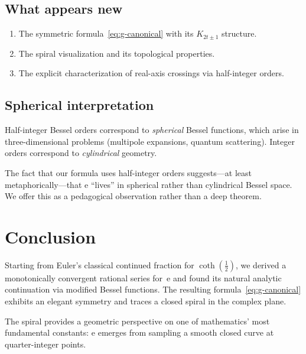 \documentclass[11pt]{article}
\theoremstyle{definition}
\theoremstyle{remark}
\newcommand{\ee}{\mathrm{e}}
\begin{document}
\subsection{What appears new}

\begin{enumerate}
\item The symmetric formula~\eqref{eq:g-canonical} with its $K_{2t\pm 1}$
structure.
\item The spiral visualization and its topological properties.
\item The explicit characterization of real-axis crossings via half-integer
orders.
\end{enumerate}

\subsection{Spherical interpretation}

Half-integer Bessel orders correspond to \emph{spherical} Bessel functions,
which arise in three-dimensional problems (multipole expansions, quantum
scattering). Integer orders correspond to \emph{cylindrical} geometry.

The fact that our formula uses half-integer orders suggests---at least
metaphorically---that $\ee$ ``lives'' in spherical rather than cylindrical
Bessel space. We offer this as a pedagogical observation rather than a
deep theorem.

\section{Conclusion}

Starting from Euler's classical continued fraction for $\coth(\frac{1}{2})$,
we derived a monotonically convergent rational series for~$\ee$ and found
its natural analytic continuation via modified Bessel functions. The
resulting formula~\eqref{eq:g-canonical} exhibits an elegant symmetry and
traces a closed spiral in the complex plane.

The spiral provides a geometric perspective on one of mathematics' most
fundamental constants: $\ee$ emerges from sampling a smooth closed curve
at quarter-integer points.



\end{document}
